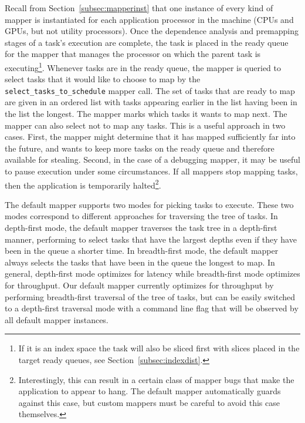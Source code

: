 Recall from Section~\ref{subsec:mapperinst} that one 
instance of every kind of mapper is instantiated for
each application processor in the machine (CPUs and 
GPUs, but not utility processors). Once the dependence 
analysis and premapping stages of a task's execution are 
complete, the task is placed in the ready queue for the 
mapper that manages the processor on which the parent task
is executing\footnote{If it is an index space the task will also
be sliced first with slices placed in the target ready
queues, see Section~\ref{subsec:indexdist}.}. Whenever
tasks are in the ready queue, the mapper is queried to
select tasks that it would like to choose to map by
the {\tt select\_tasks\_to\_schedule} mapper call. The
set of tasks that are ready to map are given in an
ordered list with tasks appearing earlier in the list
having been in the list the longest. The mapper marks
which tasks it wants to map next.  The mapper can also
select not to map any tasks.  This is a useful approach
in two cases. First, the mapper might determine that
it has mapped sufficiently far into the future, and 
wants to keep more tasks on the ready queue and therefore
available for stealing.  Second, in the case of a
debugging mapper, it may be useful to pause execution
under some circumstances.  If all mappers stop mapping
tasks, then the application is temporarily halted\footnote{
Interestingly, this can result in a certain class of
mapper bugs that make the application to appear to 
hang. The default mapper automatically guards against
this case, but custom mappers must be careful to avoid
this case themselves.}.

The default mapper supports two modes for picking tasks
to execute. These two modes correspond to different
approaches for traversing the tree of tasks. In depth-first 
mode, the default mapper traverses the task tree in a
depth-first manner, performing to select tasks that 
have the largest depths even if they have been in the
queue a shorter time.  In breadth-first mode, the
default mapper always selects the tasks that have been
in the queue the longest to map. In general, depth-first
mode optimizes for latency while breadth-first mode 
optimizes for throughput.  Our default mapper currently
optimizes for throughput by performing breadth-first
traversal of the tree of tasks, but can be easily
switched to a depth-first traversal mode with a 
command line flag that will be observed by all 
default mapper instances.


